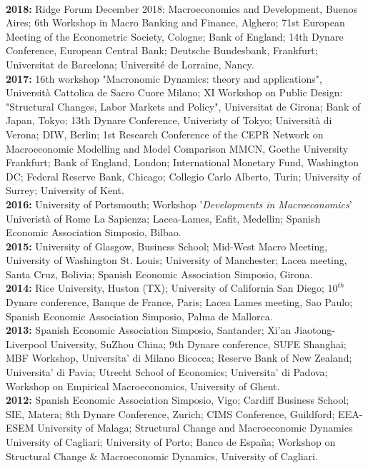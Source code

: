 \documentclass[margin, 11pt]{res} %
\begin{document}
\begin{resume}
\\
\textbf{2018:} {Ridge Forum December 2018: Macroeconomics and Development, Buenos Aires; 6th Workshop in Macro Banking and Finance, Alghero; 71st European Meeting of the Econometric Society, Cologne; Bank of England; 14th Dynare Conference, European Central Bank; Deutsche Bundesbank, Frankfurt; Universitat de Barcelona; Universit\'{e} de Lorraine, Nancy.} 
\\
\textbf{2017:} {16th workshop "Macronomic Dynamics: theory and applications", Universit\`{a} Cattolica de Sacro Cuore Milano;  XI Workshop on Public Design: "Structural Changes, Labor Markets and Policy", Universitat de Girona; Bank of Japan, Tokyo; 13th Dynare Conference, Univeristy of Tokyo; Universit\`{a} di Verona; DIW, Berlin; 1st Research Conference of the CEPR Network on Macroeconomic Modelling and Model Comparison MMCN, Goethe University Frankfurt; Bank of England, London; International Monetary Fund, Washington DC; Federal Reserve Bank, Chicago; Collegio Carlo Alberto, Turin; University of Surrey; University of Kent.} 
\\
\textbf{2016:} {University of Portsmouth; Workshop '\emph{Developments in Macroeconomics}' Univerist\`{a} of Rome La Sapienza; Lacea-Lames, Eafit, Medellin; Spanish Economic Association Simposio, Bilbao.} 
\\
\textbf{2015:} {University of Glasgow, Business School; Mid-West Macro Meeting, University of Washington St. Louis; University of Manchester; Lacea meeting, Santa Cruz, Bolivia; Spanish Economic Association Simposio, Girona.} 
\\
\textbf{2014:} {Rice University, Huston (TX); University of California San Diego; $10^{th}$ Dynare conference, Banque de France, Paris; Lacea Lames meeting, Sao Paulo; Spanish Economic Association Simposio, Palma de Mallorca.} 
\\
\textbf{2013:} {Spanish Economic Association Simposio, Santander; Xi'an Jiaotong-Liverpool University, SuZhou China; 9th Dynare conference, SUFE Shanghai; MBF Workshop, Universita' di Milano Bicocca; Reserve Bank of New Zealand; Universita' di Pavia; Utrecht School of Economics; Universita' di Padova; Workshop on Empirical Macroeconomics, University of Ghent.}
\\
\textbf{2012:} {Spanish Economic Association Simposio, Vigo; Cardiff Business School; SIE, Matera; 8th Dynare Conference, Zurich; CIMS Conference, Guildford; EEA-ESEM University of Malaga; Structural Change and Macroeconomic Dynamics University of Cagliari; University of Porto; Banco de Espa\~{n}a; Workshop on Structural Change \& Macroeconomic Dynamics, University of Cagliari.}

\end{resume}
\end{document}
